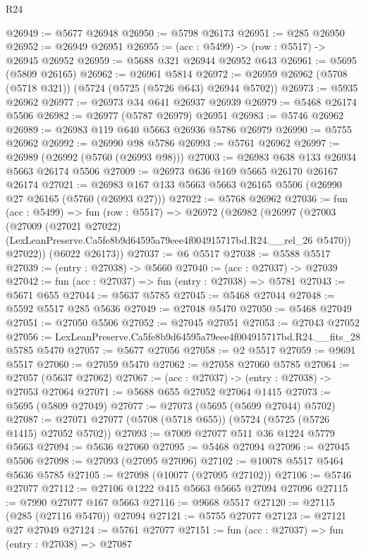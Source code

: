 \begin{lexlean}{R24}
\begin{coremodule}
@26949 := @5677 @26948
@26950 := @5798 @26173
@26951 := @285 @26950
@26952 := @26949 @26951
@26955 := (acc : @5499) -> (row : @5517) -> @26945 @26952
@26959 := @5688 @321 @26944 @26952 @643
@26961 := @5695 (@5809 @26165)
@26962 := @26961 @5814
@26972 := @26959 @26962 (@5708 (@5718 @321)) (@5724 (@5725 (@5726 @643) @26944 @5702))
@26973 := @5935 @26962
@26977 := @26973 @34 @641 @26937 @26939
@26979 := @5468 @26174 @5506
@26982 := @26977 (@5787 @26979) @26951
@26983 := @5746 @26962
@26989 := @26983 @119 @640 @5663 @26936 @5786 @26979
@26990 := @5755 @26962
@26992 := @26990 @98 @5786
@26993 := @5761 @26962
@26997 := @26989 (@26992 (@5760 (@26993 @98)))
@27003 := @26983 @638 @133 @26934 @5663 @26174 @5506
@27009 := @26973 @636 @169 @5665 @26170 @26167 @26174
@27021 := @26983 @167 @133 @5663 @5663 @26165 @5506 (@26990 @27 @26165 (@5760 (@26993 @27)))
@27022 := @5768 @26962
@27036 := fun (acc : @5499) =>
  fun (row : @5517) =>
  @26972
    (@26982
      (@26997
        (@27003
          (@27009
            (@27021 @27022)
            (LexLeanPreserve.Ca5fe8b9d64595a79eee4f004915717bd.R24.__rel_26 @5470))
          @27022))
      (@6022 @26173))
@27037 := @6 @5517
@27038 := @5588 @5517
@27039 := (entry : @27038) -> @5660
@27040 := (acc : @27037) -> @27039
@27042 := fun (acc : @27037) => fun (entry : @27038) => @5781
@27043 := @5671 @655
@27044 := @5637 @5785
@27045 := @5468 @27044
@27048 := @5592 @5517 @285 @5636
@27049 := @27048 @5470
@27050 := @5468 @27049
@27051 := @27050 @5506
@27052 := @27045 @27051
@27053 := @27043 @27052
@27056 := LexLeanPreserve.Ca5fe8b9d64595a79eee4f004915717bd.R24.__fits_28 @5785 @5470
@27057 := @5677 @27056
@27058 := @2 @5517
@27059 := @9691 @5517
@27060 := @27059 @5470
@27062 := @27058 @27060 @5785
@27064 := @27057 (@5637 @27062)
@27067 := (acc : @27037) -> (entry : @27038) -> @27053 @27064
@27071 := @5688 @655 @27052 @27064 @1415
@27073 := @5695 (@5809 @27049)
@27077 := @27073 (@5695 (@5699 @27044) @5702)
@27087 := @27071 @27077 (@5708 (@5718 @655)) (@5724 (@5725 (@5726 @1415) @27052 @5702))
@27093 := @7009 @27077 @511 @36 @1224 @5779 @5663
@27094 := @5636 @27060
@27095 := @5468 @27094
@27096 := @27045 @5506
@27098 := @27093 (@27095 @27096)
@27102 := @10078 @5517 @5464 @5636 @5785
@27105 := @27098 (@10077 (@27095 @27102))
@27106 := @5746 @27077
@27112 := @27106 @1222 @415 @5663 @5665 @27094 @27096
@27115 := @7990 @27077 @167 @5663
@27116 := @9668 @5517
@27120 := @27115 (@285 (@27116 @5470)) @27094
@27121 := @5755 @27077
@27123 := @27121 @27 @27049
@27124 := @5761 @27077
@27151 := fun (acc : @27037) =>
  fun (entry : @27038) =>
  @27087

\end{coremodule}
\end{lexlean}
